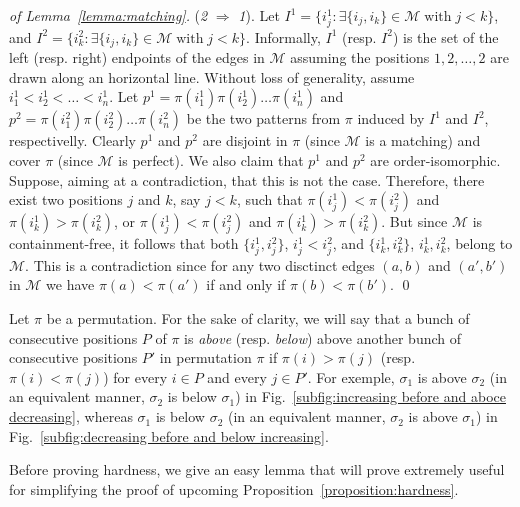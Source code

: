 \documentclass[a4paper]{llncs}
\begin{document}
\begin{proof}[of Lemma~\ref{lemma:matching}]
  (\emph{2} $\Rightarrow$ \emph{1}).
  Let $I^1 = \{i^1_j : \exists \{i_j, i_k\} \in \mathcal{M}
  \;\text{with}\; j < k\}$, and
  $I^2 = \{i^2_k : \exists \{i_j, i_k\} \in \mathcal{M}
  \;\text{with}\; j < k\}$.
  Informally, $I^1$ (resp. $I^2$) is the set of the left (resp. right) endpoints
  of the edges in $\mathcal{M}$ assuming the positions $1, 2, \ldots, 2$
  are drawn along an horizontal line.
  Without loss of generality,
  assume $i^1_1 < i^1_2 < \ldots < i^1_n$.
  Let
  $p^1 = \pi(i^1_1) \pi(i^1_2) \ldots \pi(i^1_n)$ and
  $p^2 = \pi(i^2_1) \pi(i^2_2) \ldots \pi(i^2_n)$ be the two patterns
  from $\pi$ induced by $I^1$ and $I^2$, respectivelly.
  Clearly $p^1$ and $p^2$ are disjoint in $\pi$ (since $\mathcal{M}$ is
  a matching) and cover $\pi$ (since $\mathcal{M}$ is perfect).
  We also claim that $p^1$ and $p^2$ are order-isomorphic.
  Suppose, aiming at a contradiction, that this is not the case.
  Therefore, there exist two positions $j$ and $k$, say $j < k$, such that
  $\pi(i^1_j) < \pi(i^2_j)$ and $\pi(i^1_k) > \pi(i^2_k)$, or
  $\pi(i^1_j) < \pi(i^2_j)$ and $\pi(i^1_k) > \pi(i^2_k)$.
  But since $\mathcal{M}$ is containment-free, it follows that
  both $\{i^1_j, i^2_j\}$, $i^1_j < i^2_j$, and
  $\{i^1_k, i^2_k\}$, $i^1_k, i^2_k$, belong to $\mathcal{M}$.
  This is a contradiction since
  for any two disctinct edges
  $(a, b)$ and $(a', b')$ in $\mathcal{M}$
  we have $\pi(a) < \pi(a')$ if and only if $\pi(b) < \pi(b')$.
  \qed
\end{proof}

Let $\pi$ be a permutation.
For the sake of clarity, we will say that a bunch of consecutive positions $P$
of $\pi$ is \emph{above} (resp. \emph{below}) above another bunch of consecutive
positions $P'$ in permutation $\pi$
if $\pi(i) > \pi(j)$ (resp. $\pi(i) < \pi(j)$) for every
$i \in P$ and every $j \in P'$.
For exemple, $\sigma_1$ is above $\sigma_2$
(in an equivalent manner, $\sigma_2$ is below $\sigma_1$)
in Fig.~\ref{subfig:increasing before and aboce decreasing},
whereas $\sigma_1$ is below $\sigma_2$
(in an equivalent manner, $\sigma_2$ is above $\sigma_1$)
in Fig.~\ref{subfig:decreasing before and below increasing}.

Before proving hardness, we give an easy lemma that will prove extremely
useful for simplifying the proof of upcoming
Proposition~\ref{proposition:hardness}.
\end{document}
